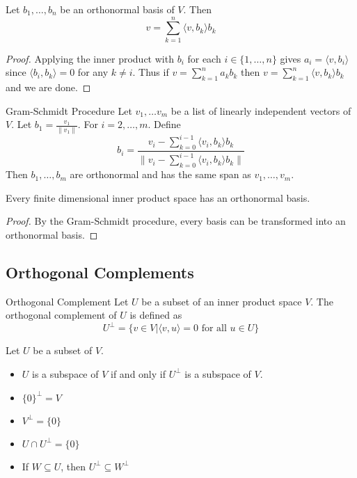 \documentclass[a4paper]{article}
\begin{document}
\begin{prp}{}{} Let $b_1,\dots,b_n$ be an orthonormal basis of $V$. Then $$v=\sum_{k=1}^n\langle v,b_k\rangle b_k$$ \tcbline
\begin{proof}
Applying the inner product with $b_i$ for each $i\in\{1,\dots,n\}$ gives $a_i=\langle v,b_i\rangle$ since $\langle b_i,b_k\rangle=0$ for any $k\neq i$. Thus if $v=\sum_{k=1}^na_kb_k$ then $v=\sum_{k=1}^n\langle v,b_k\rangle b_k$ and we are done. 
\end{proof}
\end{prp}

\begin{thm}{Gram-Schmidt Procedure}{} Let $v_1,\dots v_m$ be a list of linearly independent vectors of $V$. Let $b_1=\frac{v_1}{\|v_1\|}$. For $i=2,\dots,m$. Define $$b_i=\frac{v_i-\sum_{k=0}^{i-1}\langle v_i,b_k\rangle b_k}{\|v_i-\sum_{k=0}^{i-1}\langle v_i,b_k\rangle b_k\|}$$ Then $b_1,\dots,b_m$ are orthonormal and has the same span as $v_1,\dots,v_m$. 
\end{thm}

\begin{thm}{}{} Every finite dimensional inner product space has an orthonormal basis. \tcbline
\begin{proof}
By the Gram-Schmidt procedure, every basis can be transformed into an orthonormal basis. 
\end{proof}
\end{thm}

\subsection{Orthogonal Complements}
\begin{defn}{Orthogonal Complement}{} Let $U$ be a subset of an inner product space $V$. The orthogonal complement of $U$ is defined as $$U^{\perp}=\{v\in V|\langle v,u\rangle=0\text{ for all }u\in U\}$$
\end{defn}

\begin{prp}{}{} Let $U$ be a subset of $V$. 
\begin{itemize}
\item $U$ is a subspace of $V$ if and only if $U^\perp$ is a subspace of $V$. 
\item $\{0\}^\perp=V$
\item $V^\perp=\{0\}$
\item $U\cap U^\perp=\{0\}$
\item If $W\subseteq U$, then $U^\perp\subseteq W^\perp$
\end{itemize}
\end{prp}
\end{document}
